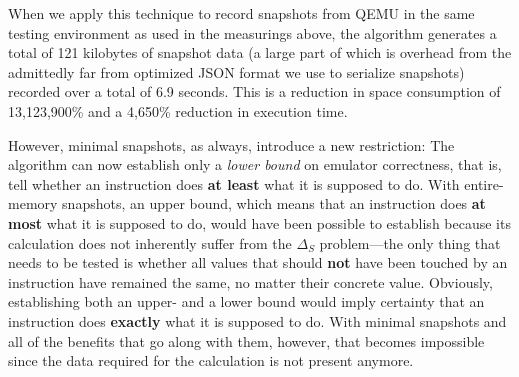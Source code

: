 When we apply this technique to record snapshots from QEMU in the same testing environment as used in the measurings
above, the algorithm generates a total of 121 kilobytes of snapshot data (a large part of which is overhead from the
admittedly far from optimized JSON format we use to serialize snapshots) recorded over a total of 6.9 seconds. This is a
reduction in space consumption of 13,123,900\% and a 4,650\% reduction in execution time.

However, minimal snapshots, as always, introduce a new restriction: The algorithm can now establish only a \textit{lower
bound} on emulator correctness, that is, tell whether an instruction does \textbf{at least} what it is supposed to do.
With entire-memory snapshots, an upper bound, which means that an instruction does \textbf{at most} what it is supposed
to do, would have been possible to establish because its calculation does not inherently suffer from the $\Delta_S$
problem---the only thing that needs to be tested is whether all values that should \textbf{not} have been touched by an
instruction have remained the same, no matter their concrete value. Obviously, establishing both an upper- and a lower
bound would imply certainty that an instruction does \textbf{exactly} what it is supposed to do. With minimal snapshots
and all of the benefits that go along with them, however, that becomes impossible since the data required for the
calculation is not present anymore.



%
%
%

